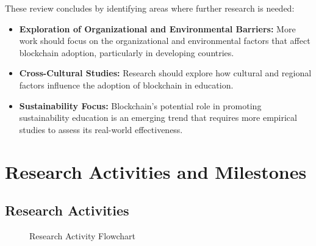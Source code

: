 \documentclass[a4paper, 12pt]{article}
\begin{document}
These review concludes by identifying areas where further research is needed:

\begin{itemize}
    \item \textbf{Exploration of Organizational and Environmental Barriers:} More work should focus on the organizational and environmental factors that affect blockchain adoption, particularly in developing countries.
    \item \textbf{Cross-Cultural Studies:} Research should explore how cultural and regional factors influence the adoption of blockchain in education.
    \item \textbf{Sustainability Focus:} Blockchain's potential role in promoting sustainability education is an emerging trend that requires more empirical studies to assess its real-world effectiveness.
\end{itemize}





\section{Research Activities and Milestones}
\subsection{Research Activities}
\begin{figure}[H] %
    \centering
    \caption{Research Activity Flowchart}
\end{figure}
\end{document}
